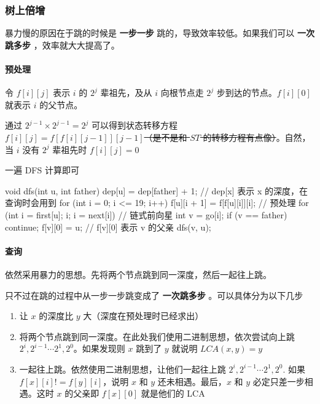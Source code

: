 \subsubsection{树上倍增}

暴力慢的原因在于跳的时候是 \textbf{ 一步一步 } 跳的，导致效率较低。如果我们可以 \textbf{ 一次跳多步 }，效率就大大提高了。

\paragraph{预处理}

令 $f[i][j]$ 表示 $i$ 的 $2^j$ 辈祖先，及从 $i$ 向根节点走 $2^j$ 步到达的节点。$f[i][0]$ 就表示 $i$ 的父节点。

通过 $2^{j-1}\times 2^{j-1}=2^j$ 可以得到状态转移方程 $f[i][j]=f[f[i][j-1]][j-1]$\st{（是不是和 $ST$ 的转移方程有点像）}。自然，当 $i$ 没有 $2^j$ 辈祖先时 $f[i][j]=0$

一遍 DFS 计算即可

\begin{cppcode}
void dfs(int u, int father) {
  dep[u] = dep[father] + 1;  // dep[x] 表示 x 的深度，在查询时会用到
  for (int i = 0; i <= 19; i++) f[u][i + 1] = f[f[u][i]][i];  // 预处理
  for (int i = first[u]; i; i = next[i])                      // 链式前向星
  {
    int v = go[i];
    if (v == father) continue;
    f[v][0] = u;  // f[v][0] 表示 v 的父亲
    dfs(v, u);
  }
}
\end{cppcode}

\paragraph{查询}

依然采用暴力的思想。先将两个节点跳到同一深度，然后一起往上跳。

只不过在跳的过程中从一步一步跳变成了 \textbf{ 一次跳多步 }。可以具体分为以下几步

\begin{enumerate}
\item 让 $x$ 的深度比 $y$ 大（深度在预处理时已经求出）
\item 将两个节点跳到同一深度。在此处我们使用二进制思想，依次尝试向上跳 $2^i,2^{i-1}\cdots 2^1,2^0$。如果发现则 $x$ 跳到了 $y$ 就说明 $LCA(x,y)=y$
\item 一起往上跳。依然使用二进制思想，让他们一起往上跳 $2^i,2^{i-1}\cdots 2^1,2^0$. 如果 $f[x][i]!=f[y][i]$，说明 $x$ 和 $y$ 还未相遇。最后，$x$ 和 $y$ 必定只差一步相遇。这时 $x$ 的父亲即 $f[x][0]$ 就是他们的 LCA
\end{enumerate}

